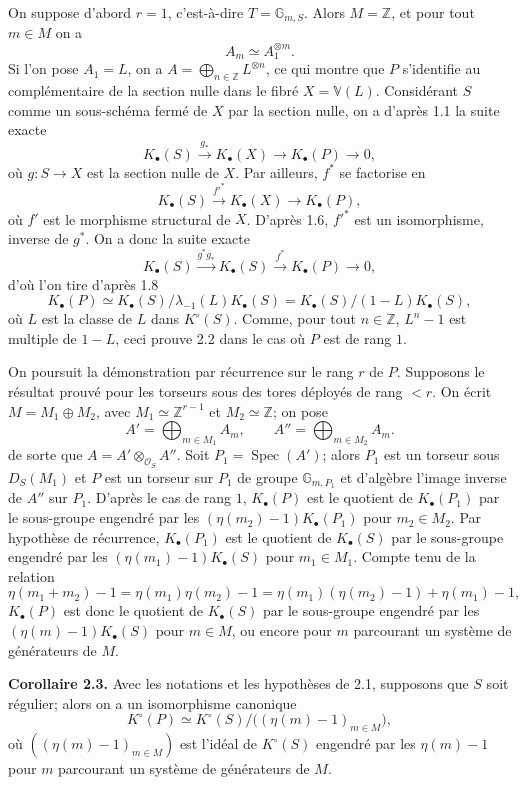 \documentclass[11pt]{article}
\newcommand{\Spec}{\operatorname{Spec}}
\begin{document}
On suppose d'abord $r=1$, c'est-à-dire $T=\mathbb G_{m,S}$. Alors $M=\mathbb Z$, et pour tout $m\in M$ on a
\[
A_m\simeq A_1^{\otimes m}.
\]
Si l'on pose $A_1=L$, on a $A=\bigoplus_{n\in\mathbb Z}L^{\otimes n}$, ce qui montre que $P$ s'identifie au complémentaire de la section nulle dans le fibré $X=\mathbb V(L)$. Considérant $S$ comme un sous-schéma fermé de $X$ par la section nulle, on a d'après 1.1 la suite exacte
\[
K_\bullet(S)\xrightarrow{g_*}K_\bullet(X)\longrightarrow K_\bullet(P)\longrightarrow 0,
\]
où $g:S\to X$ est la section nulle de $X$. Par ailleurs, $f^*$ se factorise en
\[
K_\bullet(S)\xrightarrow{f'^*}K_\bullet(X)\longrightarrow K_\bullet(P),
\]
où $f'$ est le morphisme structural de $X$. D'après 1.6, $f'^*$ est un isomorphisme, inverse de $g^*$. On a donc la suite exacte
\[
K_\bullet(S)\xrightarrow{g^*g_*}K_\bullet(S)\xrightarrow{f^*}K_\bullet(P)\longrightarrow 0,
\]
d'où l'on tire d'après 1.8
\[
K_\bullet(P)\simeq K_\bullet(S)/\lambda_{-1}(L)K_\bullet(S)=K_\bullet(S)/(1-L)K_\bullet(S),
\]
où $L$ est la classe de $L$ dans $K^\circ(S)$. Comme, pour tout $n\in\mathbb Z$, $L^n-1$ est multiple de $1-L$, ceci prouve 2.2 dans le cas où $P$ est de rang $1$.

On poursuit la démonstration par récurrence sur le rang $r$ de $P$. Supposons le résultat prouvé pour les torseurs sous des tores déployés de rang $<r$. On écrit $M=M_1\oplus M_2$, avec $M_1\simeq\mathbb Z^{r-1}$ et $M_2\simeq\mathbb Z$; on pose
\[
A'=\bigoplus_{m\in M_1}A_m,\qquad
A''=\bigoplus_{m\in M_2}A_m.
\]
de sorte que $A=A'\otimes_{\mathcal O_S}A''$. Soit $P_1=\Spec(A')$; alors $P_1$ est un torseur sous $D_S(M_1)$ et $P$ est un torseur sur $P_1$ de groupe $\mathbb G_{m,P_1}$ et d'algèbre l'image inverse de $A''$ sur $P_1$. D'après le cas de rang $1$, $K_\bullet(P)$ est le quotient de $K_\bullet(P_1)$ par le sous-groupe engendré par les $(\eta(m_2)-1)K_\bullet(P_1)$ pour $m_2\in M_2$. Par hypothèse de récurrence, $K_\bullet(P_1)$ est le quotient de $K_\bullet(S)$ par le sous-groupe engendré par les $(\eta(m_1)-1)K_\bullet(S)$ pour $m_1\in M_1$. Compte tenu de la relation
\[
\eta(m_1+m_2)-1=\eta(m_1)\eta(m_2)-1
=\eta(m_1)(\eta(m_2)-1)+\eta(m_1)-1,
\]
$K_\bullet(P)$ est donc le quotient de $K_\bullet(S)$ par le sous-groupe engendré par les $(\eta(m)-1)K_\bullet(S)$ pour $m\in M$, ou encore pour $m$ parcourant un système de générateurs de $M$.

\textbf{Corollaire 2.3.} Avec les notations et les hypothèses de 2.1, supposons que $S$ soit régulier; alors on a un isomorphisme canonique
\[
K^\circ(P)\simeq K^\circ(S)/\bigl((\eta(m)-1)_{m\in M}\bigr),
\]
où $((\eta(m)-1)_{m\in M})$ est l'idéal de $K^\circ(S)$ engendré par les $\eta(m)-1$ pour $m$ parcourant un système de générateurs de $M$.
\end{document}
